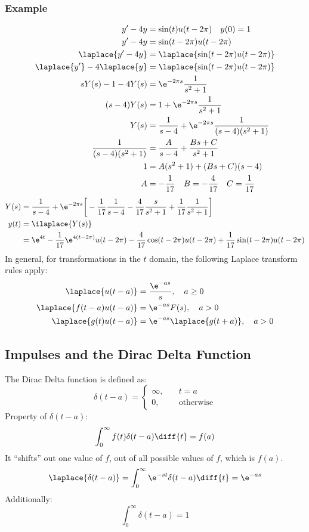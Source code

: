 \documentclass{math}
\begin{document}
\subsubsection*{Example}
\begin{align*}
  y'-4y &= \sin(t)u(t-2\pi) \quad y(0) = 1 \\
  y'-4y &= \sin(t-2\pi)u(t-2\pi) \\
  \laplace{y'-4y} &= \laplace{\sin(t-2\pi)u(t-2\pi)} \\
  \laplace{y'}-4\laplace{y} &= \laplace{\sin(t-2\pi)u(t-2\pi)} \\
  sY(s)-1-4Y(s) &= \e^{-2\pi s}\frac{1}{s^2+1} \\
  (s-4)Y(s) &= 1+\e^{-2\pi s}\frac{1}{s^2+1} \\
  Y(s) &= \frac{1}{s-4}+\e^{-2\pi s}\frac{1}{(s-4)(s^2+1)} \\
  \frac{1}{(s-4)(s^2+1)} &= \frac{A}{s-4}+\frac{Bs+C}{s^2+1} \\
  1 &= A(s^2+1)+(Bs+C)(s-4) \\
  A &= -\frac{1}{17} \quad B = -\frac{4}{17} \quad C = \frac{1}{17}
\end{align*}
\begin{align*}
  Y(s) &= \frac{1}{s-4}+\e^{-2\pi s}\bigg[
    -\frac{1}{17}\frac{1}{s-4}-\frac{4}{17}\frac{s}{s^2+1}+
    \frac{1}{17}\frac{1}{s^2+1}\bigg] \\
  y(t) &= \ilaplace{Y(s)} \\
  &= \e^{4t}-\frac{1}{17}\e^{4(t-2\pi)}u(t-2\pi)-
    \frac{4}{17}\cos(t-2\pi)u(t-2\pi)+\frac{1}{17}\sin(t-2\pi)u(t-2\pi) \\
\end{align*}
In general, for transformations in the \( t \) domain, the following Laplace
transform rules apply:
\begin{align*}
  \laplace{u(t-a)} &= \frac{\e^{-as}}{s}, \quad a\ge0 \\
  \laplace{f(t-a)u(t-a)} &= \e^{-as}F(s), \quad a>0 \\
  \laplace{g(t)u(t-a)} &= \e^{-as}\laplace{g(t+a)}, \quad a>0
\end{align*}

\subsection*{Impulses and the Dirac Delta Function}
The Dirac Delta function is defined as:
\[ \delta(t-a) = \begin{cases}
  \infty, &\quad t=a \\
  0, &\quad \text{otherwise}
\end{cases} \]
Property of \( \delta(t-a) \):
\[ \int_{0}^{\infty}f(t)\delta(t-a)\diff{t} = f(a) \]
It ``shifts'' out one value of \( f \), out of all possible values of \( f \),
which is \( f(a) \).
\[ \laplace{\delta(t-a)} = \int_{0}^{\infty}\e^{-st}\delta(t-a)\diff{t} =
  \e^{-as} \]
Additionally:
\[ \int_{0}^{\infty}\delta(t-a) = 1 \]
\end{document}
